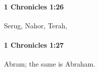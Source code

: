 		\paragraph{1 Chronicles 1:26} %
			\label{1CHRONICLES-1-26}

			Serug, Nahor, Terah,


		\paragraph{1 Chronicles 1:27} %
			\label{1CHRONICLES-1-27}

			Abram; the same is Abraham.


